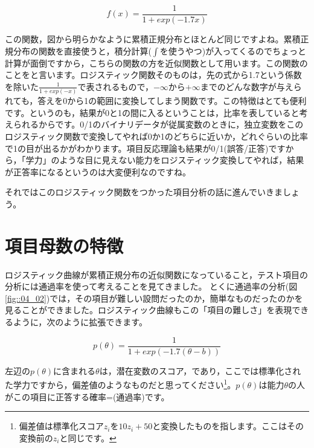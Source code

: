 \documentclass{ltjsbook}
\begin{document}
\[ f(x) = \frac{1}{1+exp(-1.7x)} \]

この関数，図から明らかなように累積正規分布とほとんど同じですよね。累積正規分布の関数を直接使うと，積分計算($\int$を使うやつ)が入ってくるのでちょっと計算が面倒ですから，こちらの関数の方を近似関数として用います。この関数のことをと言います。ロジスティック関数そのものは，先の式から1.7という係数を除いた$\frac{1}{1+exp(-x)}$で表されるもので，$-\infty$から$+\infty$までのどんな数字が与えられても，答えを0から1の範囲に変換してしまう関数です。この特徴はとても便利です。というのも，結果が0と1の間に入るということは，比率を表していると考えられるからです。0/1のバイナリデータが従属変数のときに，独立変数をこのロジスティック関数で変換してやれば0か1のどちらに近いか，どれぐらいの比率で1の目が出るかがわかります。項目反応理論も結果が0/1(誤答/正答)ですから，「学力」のような目に見えない能力をロジスティック変換してやれば，結果が正答率になるというのは大変便利なのですね。

それではこのロジスティック関数をつかった項目分析の話に進んでいきましょう。

\section{項目母数の特徴}
ロジスティック曲線が累積正規分布の近似関数になっていること，テスト項目の分析には通過率を使って考えることを見てきました。
とくに通過率の分析(図\ref{fig::04_02})では，その項目が難しい設問だったのか，簡単なものだったのかを見ることができました。ロジスティック曲線もこの「項目の難しさ」を表現できるように，次のように拡張できます。

\[ p(\theta) = \frac{1}{1+exp(-1.7 (\theta - b))} \]

左辺の$p(\theta)$に含まれる$\theta$は，潜在変数のスコア，であり，ここでは標準化された学力ですから，偏差値のようなものだと思ってください\footnote{偏差値は標準化スコア$z_i$を$10z_i+50$と変換したものを指します。ここはその変換前の$z_i$と同じです。}。$p(\theta)$は能力$\theta$の人がこの項目に正答する確率=(通過率)です。
\end{document}
